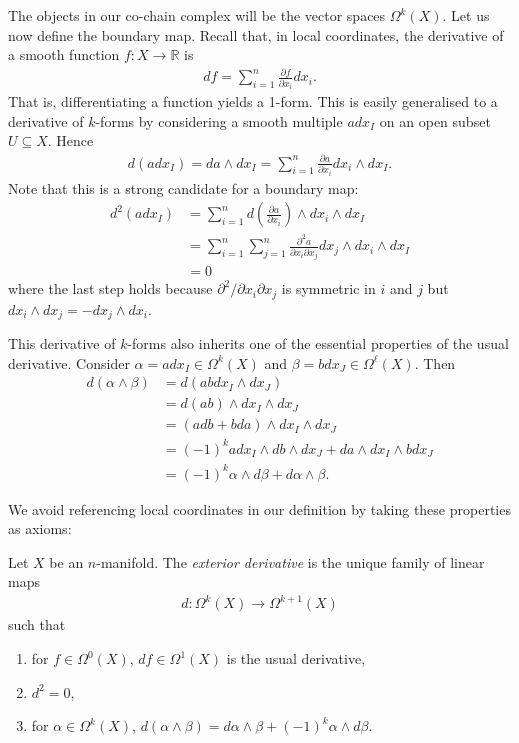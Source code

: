\documentclass{article}
\begin{document}
The objects in our co-chain complex will be the vector spaces $\Omega^k(X)$. Let us now define the boundary map. Recall that, in local coordinates,
the derivative of a smooth function $f:X\to\mathbb{R}$ is
\begin{align*}
  df = \sum_{i=1}^n \frac{\partial f}{\partial x_i} dx_i.
\end{align*}
That is, differentiating a function yields a 1-form. This is easily
generalised to a derivative of $k$-forms by considering a smooth
multiple $a dx_I$ on an open subset $U\subseteq X$. Hence
\begin{align}\label{eq:local_exterior_derivative}
  d(adx_I) = da\wedge dx_I = \sum_{i=1}^n \frac{\partial a}{\partial x_i} dx_i\wedge dx_I.
\end{align}
Note that this is a strong candidate for a boundary map:
\begin{align*}
  d^2(adx_I) &= \sum_{i=1}^{n} d\left({\frac{\partial a}{\partial x_i}}\right)\wedge dx_i \wedge dx_I\\
             &= \sum_{i=1}^{n} \sum_{j=1}^{n} \frac{\partial^2 a}{\partial x_i \partial x_j} dx_j\wedge dx_i \wedge dx_I \\
             &= 0
\end{align*}
where the last step holds because $\partial^2/\partial x_i\partial x_j$ is symmetric in $i$ and $j$ but $dx_i\wedge dx_j = -dx_j \wedge dx_i$.

This derivative of $k$-forms also inherits one of the essential properties of the usual derivative. Consider $\alpha=adx_I\in\Omega^k(X)$ and $\beta=bdx_J\in\Omega^\ell(X)$. Then
\begin{align*}
  d(\alpha\wedge\beta) &= d(abdx_I\wedge dx_J) \\
                       &= d(ab)\wedge dx_I\wedge dx_J \\
                       &= (adb + bda)\wedge dx_I\wedge dx_J \\
                       &=(-1)^k a dx_I\wedge db \wedge dx_J
                       + da \wedge dx_I\wedge bdx_J \\
                       &= (-1)^k \alpha\wedge d\beta + d\alpha\wedge\beta.
\end{align*}

We avoid referencing local coordinates in our definition by taking these
properties as axioms:

\begin{definition}
  Let $X$ be an $n$-manifold. The \emph{exterior derivative} is the
  unique family of linear maps
  \begin{align*}
    d : \Omega^k(X) \to \Omega^{k+1}(X)
  \end{align*}
  such that
  \begin{enumerate}
    \item for $f\in\Omega^0(X)$, $df\in\Omega^1(X)$ is the usual derivative,
    \item $d^2 = 0$,
    \item for $\alpha\in\Omega^k(X)$, $d(\alpha\wedge\beta) = d\alpha\wedge\beta + (-1)^k \alpha\wedge d\beta$.
  \end{enumerate}
\end{definition}
\end{document}
